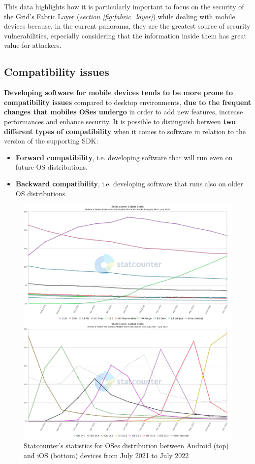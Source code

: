 This data highlights how it is particularly important to focus on the security of the Grid's Fabric Layer (\textit{section \ref{fig:fabric_layer}}) while dealing with mobile devices because, in the current panorama, they are the greatest source of security vulnerabilities, especially considering that the information inside them has great value for attackers.

\subsection{Compatibility issues}\label{compatibility_issues}
\textbf{Developing software for mobile devices tends to be more prone to compatibility issues} compared to desktop environments, \textbf{due to the frequent changes that mobiles OSes undergo} in order to add new features, increase performances and enhance security. It is possible to distinguish between \textbf{two different types of compatibility} when it comes to software in relation to the version of the supporting SDK:

\begin{itemize}
    \item \textbf{Forward compatibility}, i.e. developing software that will run even on future OS distributions.
    \item \textbf{Backward compatibility}, i.e. developing software that runs also on older OS distributions.
\end{itemize}

\begin{figure}[!ht]
    \centering
    \includegraphics[scale=0.4]{document/chapters/chapter_3/images/stat_counter_ios_android.png}
    \caption{\href{https://gs.statcounter.com/}{Statcounter}'s statistics for OSes distribution between Android (top) and iOS (bottom) devices from July 2021 to July 2022}
    \label{fig:stat_counter_ios_android}
\end{figure}

